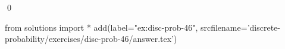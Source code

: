 
\begin{ex} 
  \label{ex:disc-prob-46}
  
  \qed
\end{ex} 
\begin{python0}
from solutions import *
add(label="ex:disc-prob-46",
    srcfilename='discrete-probability/exercises/disc-prob-46/answer.tex') 
\end{python0}
